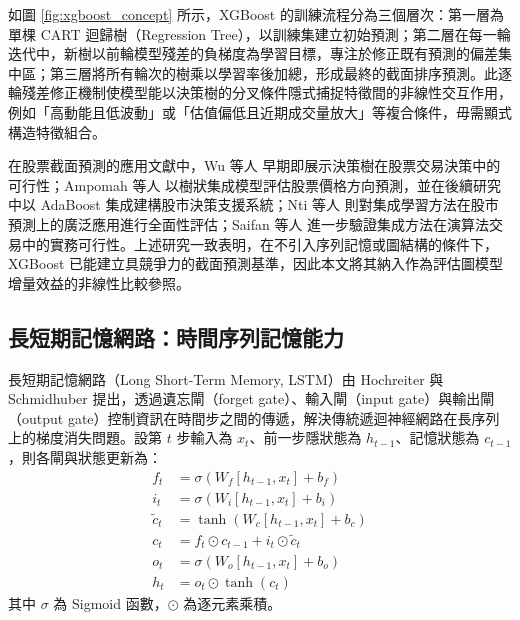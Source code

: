 如圖 \ref{fig:xgboost_concept} 所示，XGBoost 的訓練流程分為三個層次：第一層為單棵 CART 迴歸樹（Regression Tree），以訓練集建立初始預測；第二層在每一輪迭代中，新樹以前輪模型殘差的負梯度為學習目標，專注於修正既有預測的偏差集中區；第三層將所有輪次的樹乘以學習率後加總，形成最終的截面排序預測。此逐輪殘差修正機制使模型能以決策樹的分叉條件隱式捕捉特徵間的非線性交互作用，例如「高動能且低波動」或「估值偏低且近期成交量放大」等複合條件，毋需顯式構造特徵組合。

在股票截面預測的應用文獻中，Wu 等人 \cite{WU2006270} 早期即展示決策樹在股票交易決策中的可行性；Ampomah 等人 \cite{ampomah2020tree_direction} 以樹狀集成模型評估股票價格方向預測，並在後續研究 \cite{ampomah2020tree_ensemble_stock} 中以 AdaBoost 集成建構股市決策支援系統；Nti 等人 \cite{nti2020ensemble_comprehensive} 則對集成學習方法在股市預測上的廣泛應用進行全面性評估；Saifan 等人 \cite{saifan2020ensemble_trading} 進一步驗證集成方法在演算法交易中的實務可行性。上述研究一致表明，在不引入序列記憶或圖結構的條件下，XGBoost 已能建立具競爭力的截面預測基準，因此本文將其納入作為評估圖模型增量效益的非線性比較參照。

\subsection{長短期記憶網路：時間序列記憶能力}
\label{subsec:lstm_baseline}

長短期記憶網路（Long Short-Term Memory, LSTM）由 Hochreiter 與 Schmidhuber \cite{hochreiter1997lstm} 提出，透過遺忘閘（forget gate）、輸入閘（input gate）與輸出閘（output gate）控制資訊在時間步之間的傳遞，解決傳統遞迴神經網路在長序列上的梯度消失問題。設第 \(t\) 步輸入為 \(x_t\)、前一步隱狀態為 \(h_{t-1}\)、記憶狀態為 \(c_{t-1}\)，則各閘與狀態更新為：
\begin{align}
f_t &= \sigma(W_f [h_{t-1}, x_t] + b_f) \label{eq:lstm_forget} \\
i_t &= \sigma(W_i [h_{t-1}, x_t] + b_i) \label{eq:lstm_input} \\
\tilde{c}_t &= \tanh(W_c [h_{t-1}, x_t] + b_c) \label{eq:lstm_cell_candidate} \\
c_t &= f_t \odot c_{t-1} + i_t \odot \tilde{c}_t \label{eq:lstm_cell} \\
o_t &= \sigma(W_o [h_{t-1}, x_t] + b_o) \label{eq:lstm_output_gate} \\
h_t &= o_t \odot \tanh(c_t) \label{eq:lstm_hidden}
\end{align}
其中 \(\sigma\) 為 Sigmoid 函數，\(\odot\) 為逐元素乘積。

